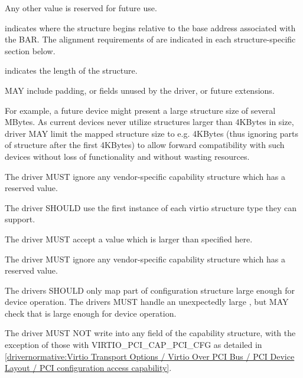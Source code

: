 \begin{description}
        Any other value is reserved for future use.

\item[\field{offset}]
        indicates where the structure begins relative to the base address associated
        with the BAR.  The alignment requirements of  are indicated
        in each structure-specific section below.

\item[\field{length}]
        indicates the length of the structure.

         MAY include padding, or fields unused by the driver, or
        future extensions.

        \begin{note}
        For example, a future device might present a large structure size of several
        MBytes.
        As current devices never utilize structures larger than 4KBytes in size,
        driver MAY limit the mapped structure size to e.g.
        4KBytes (thus ignoring parts of structure after the first
        4KBytes) to allow forward compatibility with such devices without loss of
        functionality and without wasting resources.
        \end{note}
\end{description}


The driver MUST ignore any vendor-specific capability structure which has
a reserved  value.

The driver SHOULD use the first instance of each virtio structure type they can
support.

The driver MUST accept a  value which is larger than specified here.

The driver MUST ignore any vendor-specific capability structure which has
a reserved  value.

        The drivers SHOULD only map part of configuration structure
        large enough for device operation.  The drivers MUST handle
        an unexpectedly large , but MAY check that 
        is large enough for device operation.

The driver MUST NOT write into any field of the capability structure,
with the exception of those with  VIRTIO_PCI_CAP_PCI_CFG as
detailed in \ref{drivernormative:Virtio Transport Options / Virtio Over PCI Bus / PCI Device Layout / PCI configuration access capability}.

